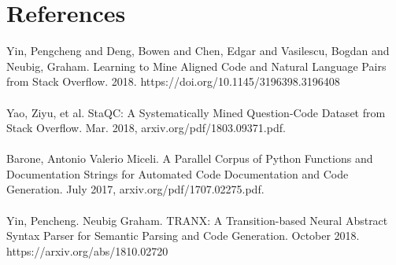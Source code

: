 \documentclass[11pt,a4paper]{article}
\begin{document}
\section{References}
Yin, Pengcheng and Deng, Bowen and Chen, Edgar and Vasilescu, Bogdan and Neubig, Graham. Learning to Mine Aligned Code and Natural Language Pairs from Stack Overflow. 2018. https://doi.org/10.1145/3196398.3196408 \\ \\
Yao, Ziyu, et al. StaQC: A Systematically Mined Question-Code Dataset from Stack Overflow. Mar. 2018, arxiv.org/pdf/1803.09371.pdf. \\ \\
Barone, Antonio  Valerio Miceli. A Parallel Corpus of Python Functions and Documentation Strings for Automated Code Documentation and Code Generation. July 2017, arxiv.org/pdf/1707.02275.pdf. \\ \\
Yin, Pencheng. Neubig Graham. TRANX: A Transition-based Neural Abstract Syntax Parser for Semantic Parsing and Code Generation. October 2018. https://arxiv.org/abs/1810.02720 \\ \\
\end{document}
